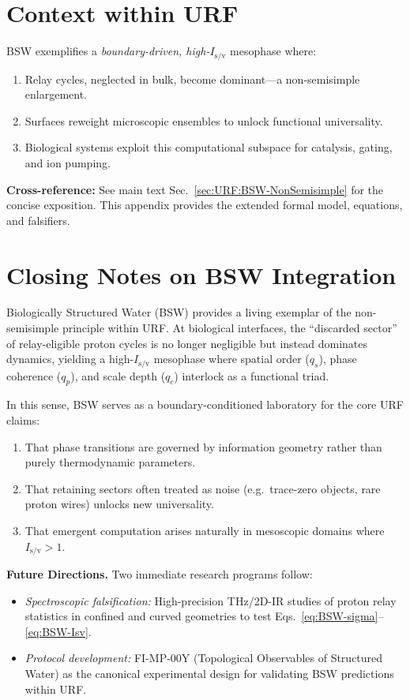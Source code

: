 \documentclass[12pt,oneside]{memoir}
\theoremstyle{plain}
\theoremstyle{definition}
\theoremstyle{remark}
\newcommand{\Isv}{\ensuremath{I_{\mathrm{s}/\mathrm{v}}}}
\begin{document}
\section{Context within URF}

BSW exemplifies a \emph{boundary-driven, high-$\Isv$} mesophase where:
\begin{enumerate}[label=\alph*.]
\item Relay cycles, neglected in bulk, become dominant—a non-semisimple enlargement.
\item Surfaces reweight microscopic ensembles to unlock functional universality.
\item Biological systems exploit this computational subspace for catalysis, gating, and ion pumping.
\end{enumerate}

\bigskip
\noindent
\textbf{Cross-reference:} See main text Sec.~\ref{sec:URF:BSW-NonSemisimple} for the concise exposition. 
This appendix provides the extended formal model, equations, and falsifiers.

\section*{Closing Notes on BSW Integration}

Biologically Structured Water (BSW) provides a living exemplar of the 
non-semisimple principle within URF. 
At biological interfaces, the ``discarded sector'' of relay-eligible proton cycles 
is no longer negligible but instead dominates dynamics, 
yielding a high-$\Isv$ mesophase where spatial order ($q_s$), 
phase coherence ($q_p$), and scale depth ($q_c$) 
interlock as a functional triad. 

In this sense, BSW serves as a boundary-conditioned laboratory for the 
core URF claims:
\begin{enumerate}
\item That phase transitions are governed by information geometry 
  rather than purely thermodynamic parameters.
\item That retaining sectors often treated as noise (e.g.\ trace-zero objects, 
  rare proton wires) unlocks new universality.
\item That emergent computation arises naturally in mesoscopic domains 
  where $\Isv > 1$.
\end{enumerate}

\noindent
\textbf{Future Directions.} 
Two immediate research programs follow:
\begin{itemize}
\item \emph{Spectroscopic falsification:} High-precision THz/2D-IR studies 
of proton relay statistics in confined and curved geometries to test 
Eqs.~\eqref{eq:BSW-sigma}–\eqref{eq:BSW-Isv}.
\item \emph{Protocol development:} FI-MP-00Y (Topological Observables of Structured Water) 
as the canonical experimental design for validating BSW predictions within URF.
\end{itemize}
\end{document}
